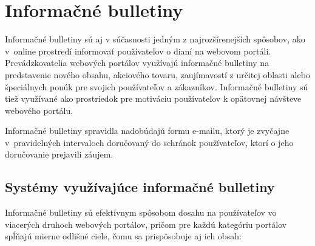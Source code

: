 \afterpage{\blankpage}
\newpage
\chapter{Informačné bulletiny}

Informačné bulletiny sú aj v súčasnosti jedným z najrozšírenejších spôsobov, ako v~online
prostredí informovať používateľov o dianí na webovom portáli. Prevádzkovatelia webových portálov využívajú informačné
bulletiny na predstavenie nového obsahu, akciového tovaru, zaujímavostí z určitej oblasti alebo špeciálnych ponúk pre
svojich používateľov a zákazníkov. Informačné bulletiny sú tiež využívané ako prostriedok pre motiváciu používateľov
k opätovnej návšteve webového portálu.

Informačné bulletiny spravidla nadobúdajú formu e-mailu, ktorý je zvyčajne v~pravidelných intervaloch doručovaný
do schránok používateľov, ktorí o jeho doručovanie prejavili záujem.


\section{Systémy využívajúce informačné bulletiny}

Informačné bulletiny sú efektívnym spôsobom dosahu na používateľov vo viacerých druhoch webových portálov,
pričom pre každú kategóriu portálov spĺňajú mierne odlišné ciele, čomu sa prispôsobuje aj ich obsah:


